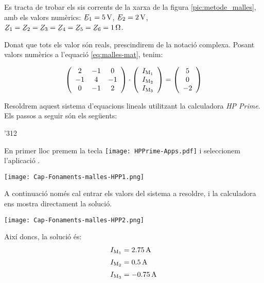 \begin{exemple}\label{ex:malles}
    Es tracta de trobar els sis corrents de la xarxa de la figura \vref{pic:metode_malles}, amb els valors numèrics: $\cmplx{E}_1=\SI{5}{V}$, $\cmplx{E}_2=\SI{2}{V}$, $\cmplx{Z}_1=\cmplx{Z}_2=\cmplx{Z}_3=\cmplx{Z}_4=\cmplx{Z}_5=\cmplx{Z}_6=\SI{1}{\ohm}$.

    Donat que tots els valor són reals, prescindirem de la notació complexa. Posant valors numèrics a l'equació \eqref{eq:malles-mat}, tenim:

    \[
      \left(
        \begin{array}{ccc}
          2 & -1 &  0 \\
         -1 &  4 & -1 \\
          0 &  -1 & 2 \\
        \end{array}
      \right)
      \cdot
      \left(
          \begin{array}{c}
            I_\mathrm{M_1} \\
            I_\mathrm{M_2} \\
            I_\mathrm{M_3} \\
          \end{array}
      \right)
      =
      \left(
          \begin{array}{c}
            5 \\
            0 \\
            -2 \\
          \end{array}
      \right)
    \]

    Resoldrem aquest sistema d'equacions lineals utilitzant la calculadora \emph{HP Prime}. Els passos a seguir són els següents:

    \begin{dingautolist}{'312}
     \item En primer lloc premem la tecla \texttt{[image: HPPrime-Apps.pdf]} i seleccionem l'aplicació .

         \texttt{[image: Cap-Fonaments-malles-HPP1.png]}
    \item A continuació només cal entrar els valors del sistema a resoldre, i la calculadora ens mostra directament la solució.

         \texttt{[image: Cap-Fonaments-malles-HPP2.png]}
    \end{dingautolist}

    Així doncs, la solució és:
    \begin{align*}
        I_\mathrm{M_1} &= \SI{2,75}{A} \\[0.5ex]
        I_\mathrm{M_2} &= \SI{0,5}{A} \\[0.5ex]
        I_\mathrm{M_3} &= \SI{-0,75}{A}
    \end{align*}


\end{exemple}
